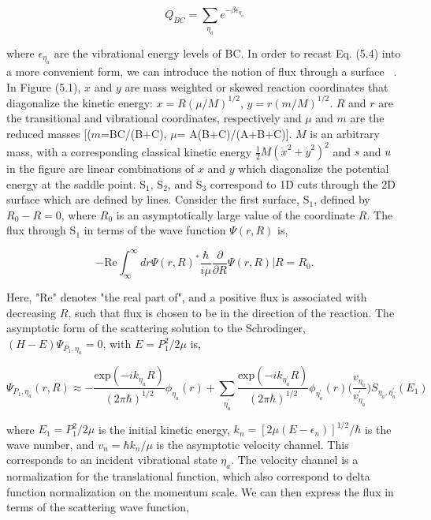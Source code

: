 \documentclass[phd,tocprelim]{cornell}
\begin{document}
\begin{equation}
Q_{BC} = \sum_{\eta_a} e^{-\beta \epsilon_{\eta_a}}
\end{equation}

where $\epsilon_{\eta_a}$ are the vibrational energy levels of BC. In order to recast Eq. (5.4) into a more convenient form, we can introduce the notion of flux through a surface ~\cite{LSCHIFF1968}. In Figure (5.1), $x$ and $y$ are mass weighted or skewed reaction coordinates that diagonalize the kinetic energy: $x= R(\mu/M)^{1/2}$, $y= r(m/M)^{1/2}$. $R$ and $r$ are the transitional and vibrational coordinates, respectively and $\mu$ and $m$ are the reduced masses [($m$=BC/(B+C), $\mu$= A(B+C)/(A+B+C)].  $M$ is an arbitrary mass, with a corresponding classical kinetic energy $\frac{1}{2} M (\dot{x}^2 + \dot{y}^2)^2$ and $s$ and $u$ in the figure are linear combinations of $x$ and $y$ which diagonalize the potential energy at the saddle point. $\textrm{S}_1$, $\textrm{S}_2$, and $\textrm{S}_3$ correspond to 1D cuts through the 2D surface which are defined by lines. Consider the first surface, $\textrm{S}_1$, defined by $R_0 -R=0$, where $R_0$ is an asymptotically large value of the coordinate $R$. The flux through $\textrm{S}_1$ in terms of the wave function $\Psi(r,R)$ is, 

\begin{equation}
-\textrm{Re} \int_{\infty}^{\infty} dr \Psi(r,R)^{*} \frac{\hbar}{i\mu}\frac{\partial}{\partial R} \Psi(r,R)| R=R_0.
\end{equation}


Here, "Re" denotes "the real part of", and a positive flux is associated with decreasing $R$, such that flux is chosen to be in the direction of the reaction. The asymptotic form of the scattering solution to the Schr$\ddot{\textrm{o}}$dinger, $(H-E)\Psi_{P_1,\eta_{a}}=0$, with $E=P_1^2/2\mu$ is, 

\begin{equation}
\Psi_{P_1, \eta_a}(r,R) \approx - \frac{\textrm{exp}(-ik_{\eta_a}R) }{(2\pi \hbar)^{1/2}} \phi_{\eta_a}(r) + \sum_{\eta_a^{'}}\frac{\textrm{exp}(-ik_{\eta_a^{'}}R) }{(2\pi \hbar)^{1/2}} \phi_{\eta_a^{'}}(r) \bigg(\frac{v_{\eta_a}}{v_{\eta_a}^{'}} \bigg) S_{\eta_a, \eta_a^{'}}(E_1)
\end{equation}

where $E_1=P_1^2/2\mu$ is the initial kinetic energy, $k_n =[2\mu(E-\epsilon_n)]^{1/2}/\hbar$ is the wave number, and $v_n= \hbar k_n/\mu$ is the asymptotic velocity channel. This corresponds to an incident vibrational state $\eta_{a}$. The velocity channel is a normalization for the translational function, which also correspond to delta function normalization on the momentum scale. 
We can then express the flux in terms of the scattering wave function,
\end{document}
